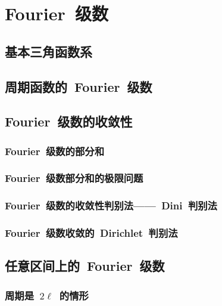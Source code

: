 

\chapter{Fourier~级数}\label{ch:14}
\section{基本三角函数系}
\begin{exercise}
\item
\end{exercise}
\section{周期函数的~Fourier~级数}
\begin{exercise}
\item
\end{exercise}
\section{Fourier~级数的收敛性}
\subsection{Fourier~级数的部分和}
\subsection{Fourier~级数部分和的极限问题}
\subsection{Fourier~级数的收敛性判别法——~Dini~判别法}
\subsection{Fourier~级数收敛的~Dirichlet~判别法}
\begin{exercise}
\item
\end{exercise}
\section{任意区间上的~Fourier~级数}
\subsection{周期是~$2\ell$~的情形}
